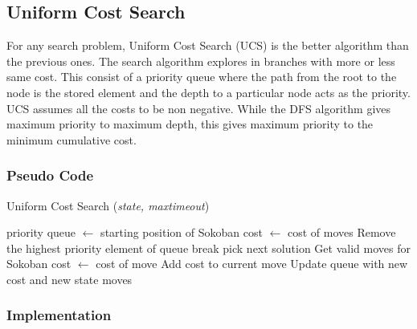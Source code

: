 \subsection{Uniform Cost Search}
\noindent For any search problem, Uniform Cost Search (UCS) is the better algorithm than the previous ones. The search algorithm explores in branches with more or less same cost. This consist of a priority queue where the path from the root to the node is the stored element and the depth to a particular node acts as the priority. UCS assumes all the costs to be non negative. While the DFS algorithm gives maximum priority to maximum depth, this gives maximum priority to the minimum cumulative cost.

\subsubsection{Pseudo Code}
\begin{algorithm}[H]
	\caption{Uniform Cost Search (\textit{state, maxtimeout})}
	\label{alg:ucs}
	\begin{algorithmic}[1]
	\State priority queue $\gets$ starting position of Sokoban
	\State cost $\gets$ cost of moves
		\State Remove the highest priority element of queue
			\State break
		\Else
				\State pick next solution
			\Else
				\State Get valid moves for Sokoban
					\State cost $\gets$ cost of move
					\State Add cost to current move
					\State Update queue with new cost and new state
				\EndFor
			\EndIf
		\EndIf
	\EndWhile
	\State \Return moves
	\end{algorithmic}
\end{algorithm}

\subsubsection{Implementation}

